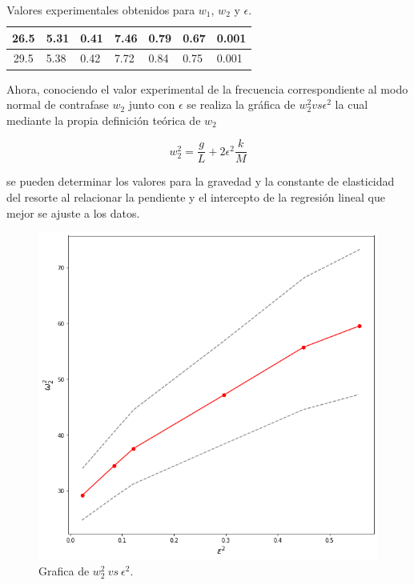 \documentclass[10pt]{article}
\begin{document}
\begin{table}[H]
\begin{tabular}{|c|ll|ll|ll|}
            26.5                                        & \multicolumn{1}{l|}{5.31}         & 0.41                              & \multicolumn{1}{l|}{7.46}         & 0.79                              & \multicolumn{1}{l|}{0.67}         & 0.001                             \\ \hline
            29.5                                        & \multicolumn{1}{l|}{5.38}         & 0.42                              & \multicolumn{1}{l|}{7.72}         & 0.84                              & \multicolumn{1}{l|}{0.75}         & 0.001                             \\ \hline
            \end{tabular}
            \caption{Valores experimentales obtenidos para $w_1$, $w_2$ y $\epsilon$.}
            \label{datatable}
        \end{table}

        Ahora, conociendo el valor experimental de la frecuencia correspondiente al modo normal de contrafase $ w_2 $ junto con $ \epsilon $ se realiza la gráfica de $ w_2^2 vs \epsilon^2 $ la cual mediante la propia definición teórica de $ w_2 $

        \begin{equation}
            w_2^2 = \frac{g}{L} + 2 \epsilon^2 \frac{k}{M}
        \end{equation}

        se pueden determinar los valores para la gravedad y la constante de elasticidad del resorte al relacionar la pendiente y el intercepto de la regresión lineal que mejor se ajuste a los datos.

        \begin{figure}[H]
            \centering
            \includegraphics[scale = 0.3]{img/omaga_vs_epsilon.png}
            \caption{Grafica de $w_2^2 \: vs \: \epsilon^2$.}
        \end{figure}
\end{document}
